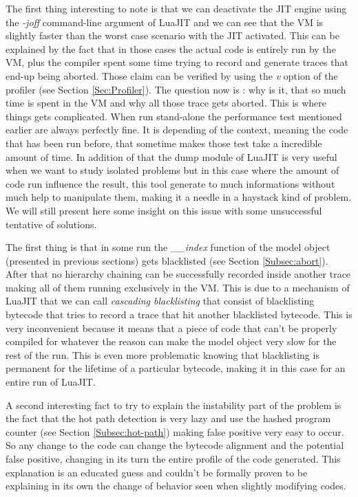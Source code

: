 
The first thing interesting to note is that we can deactivate the JIT engine using
the \emph{-joff} command-line argument of LuaJIT and we can see that the VM is
slightly faster than the worst case scenario with the JIT activated. This can
be explained by the fact that in those cases the actual code is entirely run by
the VM, plus the compiler spent some time trying to record and generate traces
that end-up being aborted. Those claim can be verified by using the \emph{v}
option of the profiler (see Section \ref{Sec:Profiler}). The question now is :
why is it, that so much time is spent in the VM and why all those trace gets
aborted. This is where things gets complicated. When run stand-alone the
performance test mentioned earlier are always perfectly fine. It is depending of
the context, meaning the code that has been run before, that sometime makes those
test take a incredible amount of time. In addition of that the dump module of
LuaJIT is very useful when we want to study isolated problems but in this case
where the amount of code run influence the result, this tool generate to much
informations without much help to manipulate them, making it a needle in a
haystack kind of problem.\\

We will still present here some insight on this issue with some unsuccessful
tentative of solutions.

The first thing is that in some run the \emph{\_\_index}
function of the model object (presented in previous sections) gets blacklisted
(see Section \ref{Subsec:abort}). After that no hierarchy chaining can be
successfully recorded inside another trace making all of them running
exclusively in the VM. This is due to a mechanism of LuaJIT that we can call
\emph{cascading blacklisting} that consist of blacklisting bytecode that tries to
record a trace that hit another blacklisted bytecode. This is very inconvenient
because it means that a piece of code that can't be properly compiled for
whatever the reason can make the model object very slow for the rest of the run.
This is even more problematic knowing that blacklisting is permanent for the
lifetime of a particular bytecode, making it in this case for an entire run of
LuaJIT.

A second interesting fact to try to explain the instability part of the problem
is the fact that the hot path detection is very lazy and use the hashed program
counter (see Section \ref{Subsec:hot-path}) making false positive very easy to
occur. So any change to the code can change the bytecode alignment and the
potential false positive, changing in its turn the entire profile of the code
generated. This explanation is an educated guess and couldn't be formally proven
to be explaining in its own the change of behavior seen when slightly modifying
codes.

